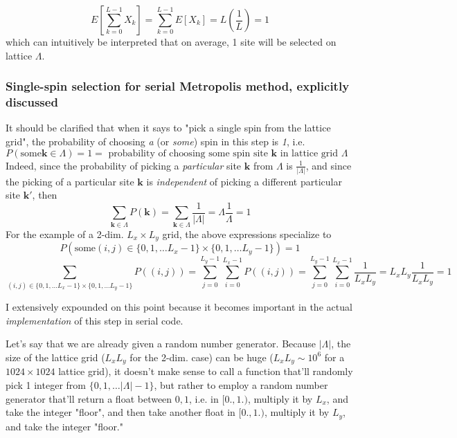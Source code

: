 \documentclass[10pt]{amsart}
\begin{document}
\begin{multicols*}{2}
\[
E \left[ \sum_{k=0}^{L-1} X_k \right] = \sum_{k=0}^{L-1} E[X_k] = L \left( \frac{1}{L} \right) = 1
\]
which can intuitively be interpreted that on average, 1 site will be selected on lattice $\Lambda$.  


\subsubsection{Single-spin selection for serial Metropolis method, explicitly discussed}  

It should be clarified that when it says to "pick a single spin from the lattice grid", the probability of choosing \emph{a} (or \emph{some}) spin in this step is \emph{1}, i.e. 
\[
P(\text{some} \mathbf{k} \in \Lambda) = 1 = \text{ probability of choosing some spin site $\mathbf{k}$ in lattice grid $\Lambda$ }  
\]
Indeed, since the probability of picking a \emph{particular} site $\mathbf{k}$ from $\Lambda$ is $\frac{1}{|\Lambda|}$, and since the picking of a particular site $\mathbf{k}$ is \emph{independent} of picking a different particular site $\mathbf{k}'$, then 
\[
\sum_{\mathbf{k} \in \Lambda} P(\mathbf{k}) = \sum_{\mathbf{k} \in \Lambda} \frac{1}{ |\Lambda|} = \Lambda \frac{1}{ \Lambda } = 1
\] 
For the example of a 2-dim. $L_x\times L_y$ grid, the above expressions specialize to 
\[
P( \text{some} (i,j) \in \lbrace 0,1,\dots L_x -1 \rbrace \times \lbrace 0,1,\dots L_y -1 \rbrace ) = 1
\]
\[
\sum_{  (i,j) \in \lbrace 0,1,\dots L_x -1 \rbrace \times \lbrace 0,1,\dots L_y -1 \rbrace } P((i,j)) = \sum_{j=0}^{L_y-1} \sum_{i=0}^{L_x-1} P((i,j)) = \sum_{j=0}^{L_y-1} \sum_{i=0}^{L_x-1} \frac{1}{ L_xL_y } = L_x L_y  \frac{1}{ L_x L_y } = 1
\]

I extensively expounded on this point because it becomes important in the actual \emph{implementation} of this step in serial code.  

Let's say that we are already given a random number generator.  Because $|\Lambda|$, the size of the lattice grid ($L_xL_y$ for the 2-dim. case) can be huge ($L_xL_y \sim 10^6$ for a $1024 \times 1024$ lattice grid), it doesn't make sense to call a function that'll randomly pick 1 integer from $\lbrace 0 ,1,\dots |\Lambda|-1 \rbrace$, but rather to employ a random number generator that'll return a float between $0,1$, i.e. in $[0.,1.)$, multiply it by $L_x$, and take the integer "floor", and then take another float in $[0.,1.)$, multiply it by $L_y$, and take the integer "floor."  


\end{multicols*}
\end{document}
